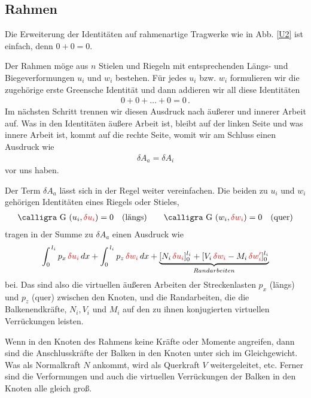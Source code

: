 {{{{%
{\textcolor{sectionTitleBlue}{\section{Rahmen}}}
Die Erweiterung der Identit\"{a}ten auf rahmenartige Tragwerke wie in Abb. \ref{U2} ist einfach, denn
$0 + 0 = 0$.

Der Rahmen m\"{o}ge aus $n$ Stielen und Riegeln mit entsprechenden L\"{a}ngs- und Biegeverformungen $u_i$ und $w_i$ bestehen. F\"{u}r jedes
$u_i$ bzw. $w_i $ formulieren wir die zugeh\"{o}rige erste Greensche Identit\"{a}t und dann addieren wir all diese Identit\"{a}ten
 \begin{align}
 0 + 0 + \ldots + 0 = 0\,.
 \end{align}
Im n\"{a}chsten Schritt trennen wir diesen Ausdruck nach \"{a}u{\ss}erer und innerer Arbeit auf. Was in den Identit\"{a}ten \"{a}u{\ss}ere Arbeit ist, bleibt auf der linken Seite und was innere Arbeit ist, kommt auf die rechte Seite, womit wir am Schluss einen Ausdruck wie
\begin{align} \label{Eq13}
\delta A_a = \delta A_i
\end{align}
vor uns haben.

Der Term $\delta A_a $ l\"{a}sst sich in der Regel weiter vereinfachen. Die beiden zu $u_i$ und $w_i$ geh\"{o}rigen Identit\"{a}ten eines Riegels oder Stieles,
\begin{align}
\text{\normalfont\calligra G\,\,}(u_i, \textcolor{red}{\delta u_i}) = 0\quad \text{(l\"{a}ngs)}\qquad  \text{\normalfont\calligra G\,\,}(w_i, \textcolor{red}{\delta w_i}) = 0 \quad \text{(quer)}
\end{align}
tragen in der Summe zu $\delta A_a$ einen Ausdruck wie
\begin{align}
\int_0^{\,l_i} p_x\,\textcolor{red}{\delta u_i}\,dx  + \int_0^{\,l_i} p_z\,\textcolor{red}{\delta w_i}\,dx  + \underbrace{[N_i\,\textcolor{red}{\delta u_i}]_0^{l_i} + [V_i\,\textcolor{red}{\delta w_i} - M_i\,\textcolor{red}{\delta w_i'}]_0^{l_i}}_{Randarbeiten}
\end{align}
bei. Das sind also die virtuellen \"{a}u{\ss}eren Arbeiten der Streckenlasten $p_x$ (l\"{a}ngs) und $p_z$ (quer) zwischen den Knoten, und die Randarbeiten, die die Balken\-endkr\"{a}fte, $ N_i, V_i$ und $M_i$ auf den zu ihnen konjugierten virtuellen Verr\"{u}ckungen leisten.

Wenn in den Knoten des Rahmens keine Kr\"{a}fte oder Momente angreifen, dann sind die Anschlusskr\"{a}fte der Balken in den Knoten unter sich im Gleichgewicht. Was als Normalkraft $N$ ankommt, wird als Querkraft $V$ weitergeleitet, etc. Ferner sind die Verformungen und auch die virtuellen Verr\"{u}ckungen der Balken in den Knoten alle gleich gro{\ss}.

}}}}
